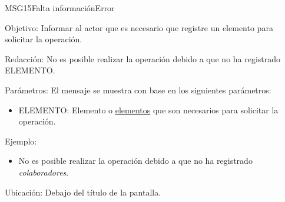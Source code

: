 \begin{mensaje}{MSG15}{Falta información}{Error}
	\item [Objetivo:] Informar al actor que es necesario que registre un elemento para solicitar la operación.
	\item[Redacción:] No es posible realizar la operación debido a que no ha registrado ELEMENTO.
	\item[Parámetros:] El mensaje se muestra con base en los siguientes parámetros:
	\begin{itemize}
		\item ELEMENTO: Elemento o \hyperlink{tElemento}{elementos} que son necesarios para solicitar la operación.
	\end{itemize}
	\item[Ejemplo:] \begin{itemize}
		\item No es posible realizar la operación debido a que no ha registrado {\em colaboradores}.
	\end{itemize}
	\item [Ubicación:] Debajo del título de la pantalla.
\end{mensaje}